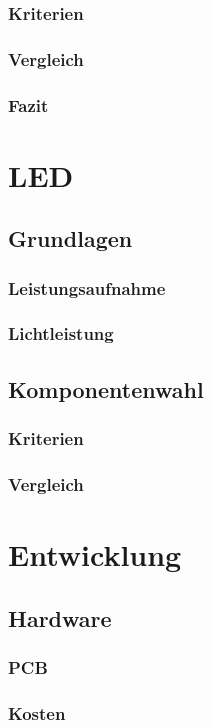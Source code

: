 \documentclass[12pt]{article}
\begin{document}
	\subsubsection{Kriterien}
	\subsubsection{Vergleich}
	\subsubsection{Fazit}
	
	\newpage
	\section{LED}
	\subsection{Grundlagen}
	\subsubsection{Leistungsaufnahme}
	\subsubsection{Lichtleistung}
	\subsection{Komponentenwahl}
	\subsubsection{Kriterien}
	\subsubsection{Vergleich}
	
	\newpage
	\section{Entwicklung}
	\subsection{Hardware}
	\subsubsection{PCB}
	\subsubsection{Kosten}
\end{document}
